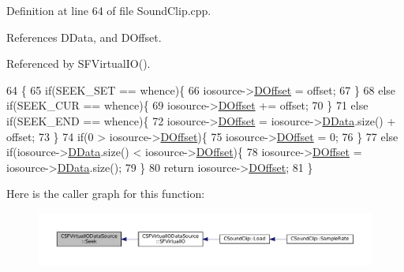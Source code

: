 Definition at line 64 of file Sound\+Clip.\+cpp.



References D\+Data, and D\+Offset.



Referenced by S\+F\+Virtual\+I\+O().


\begin{DoxyCode}
64                                                                                                       \{
65     \textcolor{keywordflow}{if}(SEEK\_SET == whence)\{
66         iosource->\hyperlink{classCSFVirtualIODataSource_a29db7bf8a3a7103deacb80bf619919c8}{DOffset} = offset;
67     \}
68     \textcolor{keywordflow}{else} \textcolor{keywordflow}{if}(SEEK\_CUR == whence)\{
69         iosource->\hyperlink{classCSFVirtualIODataSource_a29db7bf8a3a7103deacb80bf619919c8}{DOffset} += offset;
70     \}
71     \textcolor{keywordflow}{else} \textcolor{keywordflow}{if}(SEEK\_END == whence)\{
72         iosource->\hyperlink{classCSFVirtualIODataSource_a29db7bf8a3a7103deacb80bf619919c8}{DOffset} = iosource->\hyperlink{classCSFVirtualIODataSource_ac03be5c46b6647150e12edc04fa52ede}{DData}.size() + offset;        
73     \}
74     \textcolor{keywordflow}{if}(0 > iosource->\hyperlink{classCSFVirtualIODataSource_a29db7bf8a3a7103deacb80bf619919c8}{DOffset})\{
75         iosource->\hyperlink{classCSFVirtualIODataSource_a29db7bf8a3a7103deacb80bf619919c8}{DOffset} = 0;    
76     \}
77     \textcolor{keywordflow}{else} \textcolor{keywordflow}{if}(iosource->\hyperlink{classCSFVirtualIODataSource_ac03be5c46b6647150e12edc04fa52ede}{DData}.size() < iosource->\hyperlink{classCSFVirtualIODataSource_a29db7bf8a3a7103deacb80bf619919c8}{DOffset})\{
78         iosource->\hyperlink{classCSFVirtualIODataSource_a29db7bf8a3a7103deacb80bf619919c8}{DOffset} = iosource->\hyperlink{classCSFVirtualIODataSource_ac03be5c46b6647150e12edc04fa52ede}{DData}.size();
79     \}
80     \textcolor{keywordflow}{return} iosource->\hyperlink{classCSFVirtualIODataSource_a29db7bf8a3a7103deacb80bf619919c8}{DOffset};
81 \}
\end{DoxyCode}
Here is the caller graph for this function\+:\nopagebreak
\begin{figure}[H]
\begin{center}
\leavevmode
\includegraphics[width=350pt]{classCSFVirtualIODataSource_a04735e135ffc05dd53fce944e772fcfc_icgraph}
\end{center}
\end{figure}
\hypertarget{classCSFVirtualIODataSource_a9c15fbbe734fdfc2af17ca8f424b7e43}{}\label{classCSFVirtualIODataSource_a9c15fbbe734fdfc2af17ca8f424b7e43} 

